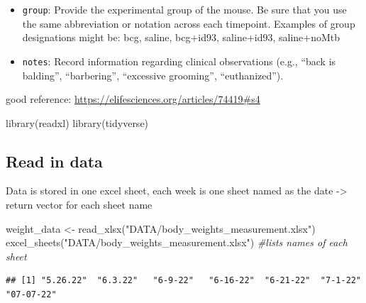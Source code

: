 \documentclass[
]{book}
\newenvironment{Shaded}{\begin{snugshade}}{\end{snugshade}}
\newcommand{\CommentTok}[1]{\textcolor[rgb]{0.56,0.35,0.01}{\textit{#1}}}
\newcommand{\FunctionTok}[1]{\textcolor[rgb]{0.00,0.00,0.00}{#1}}
\newcommand{\NormalTok}[1]{#1}
\newcommand{\OtherTok}[1]{\textcolor[rgb]{0.56,0.35,0.01}{#1}}
\newcommand{\StringTok}[1]{\textcolor[rgb]{0.31,0.60,0.02}{#1}}
\begin{document}
\begin{itemize}
\item
  \texttt{group}: Provide the experimental group of the mouse. Be sure that you use the same abbreviation or notation across each timepoint. Examples of group designations might be: bcg, saline, bcg+id93, saline+id93, saline+noMtb
\item
  \texttt{notes}: Record information regarding clinical observations (e.g., ``back is balding'', ``barbering'', ``excessive grooming'', ``euthanized'').
\end{itemize}

good reference: \url{https://elifesciences.org/articles/74419\#s4}

\begin{Shaded}
\begin{Highlighting}[]
\FunctionTok{library}\NormalTok{(readxl)}
\FunctionTok{library}\NormalTok{(tidyverse)}
\end{Highlighting}
\end{Shaded}

\hypertarget{read-in-data}{%
\subsection{Read in data}\label{read-in-data}}

Data is stored in one excel sheet, each week is one sheet named as the date -\textgreater{} return vector for each sheet name

\begin{Shaded}
\begin{Highlighting}[]
\NormalTok{weight\_data }\OtherTok{\textless{}{-}} \FunctionTok{read\_xlsx}\NormalTok{(}\StringTok{"DATA/body\_weights\_measurement.xlsx"}\NormalTok{)}
\FunctionTok{excel\_sheets}\NormalTok{(}\StringTok{"DATA/body\_weights\_measurement.xlsx"}\NormalTok{) }\CommentTok{\#lists names of each sheet}
\end{Highlighting}
\end{Shaded}

\begin{verbatim}
## [1] "5.26.22"  "6.3.22"   "6-9-22"   "6-16-22"  "6-21-22"  "7-1-22"   "07-07-22"
\end{verbatim}
\end{document}
